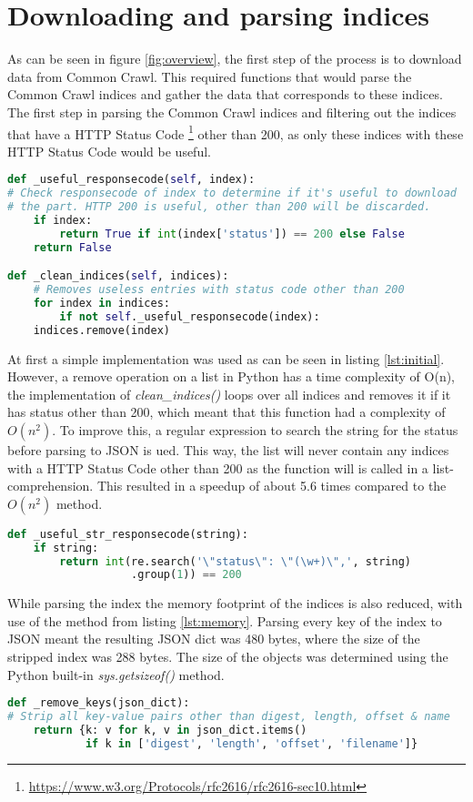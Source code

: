 \section{Downloading and parsing indices}

As can be seen in figure \ref{fig:overview}, the first step of the process is to download data from Common Crawl. This required functions that would parse the Common Crawl indices and gather the data that corresponds to these indices. The first step in parsing the Common Crawl indices and filtering out the indices that have a HTTP Status Code \footnote{\url{https://www.w3.org/Protocols/rfc2616/rfc2616-sec10.html}} other than 200, as only these indices with these HTTP Status Code would be useful. 

\begin{lstlisting}[language=Python, caption=Initial implementation, label={lst:initial}]
def _useful_responsecode(self, index):
# Check responsecode of index to determine if it's useful to download
# the part. HTTP 200 is useful, other than 200 will be discarded.
    if index:
        return True if int(index['status']) == 200 else False
    return False

def _clean_indices(self, indices):
    # Removes useless entries with status code other than 200
    for index in indices:
        if not self._useful_responsecode(index):
    indices.remove(index)
\end{lstlisting}

At first a simple implementation was used as can be seen in listing \ref{lst:initial}. However, a remove operation on a list in Python has a time complexity of O(n), the implementation of \textit{clean\_indices()} loops over all indices and removes it if it has status other than 200, which meant that this function had a complexity of $O(n^2)$. To improve this, a regular expression to search the string for the status before parsing to JSON is ued. This way, the list will never contain any indices with a HTTP Status Code other than 200 as the function will is called in a list-comprehension. This resulted in a speedup of about 5.6 times compared to the $O(n^2)$ method.

\begin{lstlisting}[language=Python, caption=Regex solution]
def _useful_str_responsecode(string):
    if string:
        return int(re.search('\"status\": \"(\w+)\",', string)
                   .group(1)) == 200
\end{lstlisting}

While parsing the index the memory footprint of the indices is also reduced, with use of the method from listing \ref{lst:memory}. Parsing every key of the index to JSON meant the resulting JSON dict was 480 bytes, where the size of the stripped index was 288 bytes. The size of the objects was determined using the Python built-in \textit{sys.getsizeof()} method. 

\begin{lstlisting}[language=Python, caption=Reducing memory footprint, label={lst:memory}]
def _remove_keys(json_dict):
# Strip all key-value pairs other than digest, length, offset & name
    return {k: v for k, v in json_dict.items()
            if k in ['digest', 'length', 'offset', 'filename']}
\end{lstlisting}

